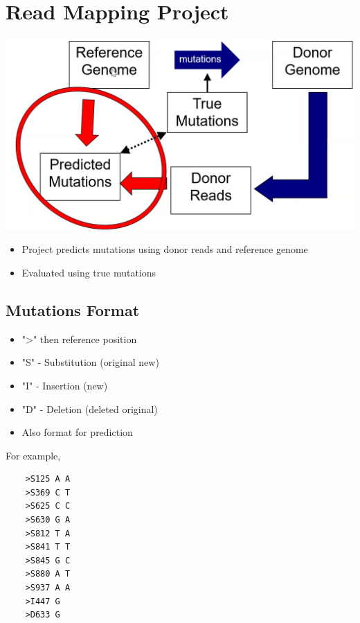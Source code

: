 \documentclass[10pt]{article}
\begin{document}
\section*{Read Mapping Project}
\begin{center}
    \includegraphics*[scale=0.5]{W1_7.png}
\end{center}
\begin{itemize}
    \item Project predicts mutations using donor reads and reference genome
    \item Evaluated using true mutations
\end{itemize}
\subsection*{Mutations Format}
\begin{itemize}
    \item ">" then reference position
    \item "S" - Substitution (original new)
    \item "I" - Insertion (new)
    \item "D" - Deletion (deleted original)
    \item Also format for prediction
\end{itemize}
For example, 
\begin{verbatim}
    >S125 A A
    >S369 C T
    >S625 C C
    >S630 G A
    >S812 T A
    >S841 T T
    >S845 G C
    >S880 A T
    >S937 A A
    >I447 G
    >D633 G
\end{verbatim}
\end{document}
